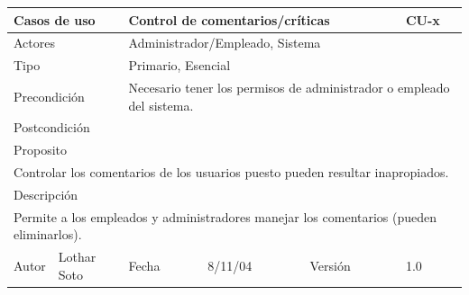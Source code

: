 \documentclass{article}
\begin{document}
\begin{table}[h]
\begin{tabular}{|l|l|l|l|l|l|}
\hline
\multicolumn{2}{|p{2cm}|}{Casos de uso}  & \multicolumn{3}{p{7cm}|}{Control de comentarios/críticas} & CU-x \\
\hline
\multicolumn{2}{|p{2cm}|}{Actores}       & \multicolumn{4}{p{8cm}|}{Administrador/Empleado, Sistema}        \\
\hline
\multicolumn{2}{|p{2cm}|}{Tipo}          & \multicolumn{4}{p{8cm}|}{Primario, Esencial}        \\
\hline
\multicolumn{2}{|p{2cm}|}{Precondición}  & \multicolumn{4}{p{8cm}|}{Necesario tener los permisos de administrador o empleado del sistema.}        \\
\hline
\multicolumn{2}{|p{2cm}|}{Postcondición} & \multicolumn{4}{p{8cm}|}{}        \\
\hline
\multicolumn{6}{|p{10cm}|}{Proposito}                                   \\
\hline
\multicolumn{6}{|p{10cm}|}{Controlar los comentarios de los usuarios puesto pueden resultar inapropiados.}                                            \\
\hline
\multicolumn{6}{|p{10cm}|}{Descripción}                                 \\
\hline
\multicolumn{6}{|p{10cm}|}{Permite a los empleados y administradores  manejar los comentarios (pueden eliminarlos).}                                            \\
\hline
Autor          &       Lothar Soto        & Fecha    &  8/11/04   &   Versión  & 1.0\\    
\hline
\end{tabular}
\end{table}
\end{document}
